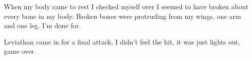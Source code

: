 When my body came to rest I checked myself over I seemed to have broken about every bone in my body. Broken bones were protruding from my wings, one arm and one leg. I'm done for.

Leviathan came in for a final attack, I didn't feel the hit, it was just lights out, game over.
















